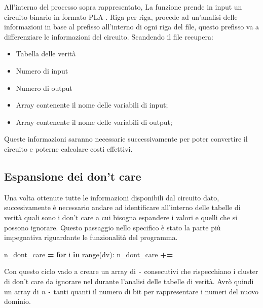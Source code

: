 \documentclass[
  italian,
]{book}
\newenvironment{Shaded}{\begin{snugshade}}{\end{snugshade}}
\newcommand{\BuiltInTok}[1]{#1}
\newcommand{\ControlFlowTok}[1]{\textcolor[rgb]{0.13,0.29,0.53}{\textbf{#1}}}
\newcommand{\KeywordTok}[1]{\textcolor[rgb]{0.13,0.29,0.53}{\textbf{#1}}}
\newcommand{\NormalTok}[1]{#1}
\newcommand{\OperatorTok}[1]{\textcolor[rgb]{0.81,0.36,0.00}{\textbf{#1}}}
\newcommand{\StringTok}[1]{\textcolor[rgb]{0.31,0.60,0.02}{#1}}
\providecommand{\tightlist}{%
  \setlength{\itemsep}{0pt}\setlength{\parskip}{0pt}}
\begin{document}
All'interno del processo sopra rappresentato, La funzione prende in input un circuito binario in formato PLA . Riga per riga, procede ad un'analisi delle informazioni in base al prefisso all'interno di ogni riga del file, questo prefisso va a differenziare le informazioni del circuito. Scandendo il file recupera:

\begin{itemize}
\tightlist
\item
  Tabella delle verità
\item
  Numero di input
\item
  Numero di output
\item
  Array contenente il nome delle variabili di input;
\item
  Array contenente il nome delle variabili di output;
\end{itemize}

Queste informazioni saranno necessarie successivamente per poter convertire il circuito e poterne calcolare costi effettivi.

\newpage

\hypertarget{espansione-dei-dont-care}{%
\subsection{Espansione dei don't care}\label{espansione-dei-dont-care}}

Una volta ottenute tutte le informazioni disponibili dal circuito dato, succesivamente è necessario andare ad identificare all'interno delle tabelle di verità quali sono i don't care a cui bisogna espandere i valori e quelli che si possono ignorare. Questo passaggio nello specifico è stato la parte più impegnativa riguardante le funzionalità del programma.

\begin{Shaded}
\begin{Highlighting}[]
\NormalTok{n\_dont\_care }\OperatorTok{=} \StringTok{\textquotesingle{}\textquotesingle{}}
  \ControlFlowTok{for}\NormalTok{ i }\KeywordTok{in} \BuiltInTok{range}\NormalTok{(dv):}
\NormalTok{    n\_dont\_care }\OperatorTok{+=} \StringTok{\textquotesingle{}{-}\textquotesingle{}}
\end{Highlighting}
\end{Shaded}

Con questo ciclo vado a creare un array di \texttt{-} consecutivi che rispecchiano i cluster di don't care da ignorare nel durante l'analisi delle tabelle di verità. Avrò quindi un array di \emph{n} \texttt{-} tanti quanti il numero di bit per rappresentare i numeri del nuovo dominio.
\end{document}
